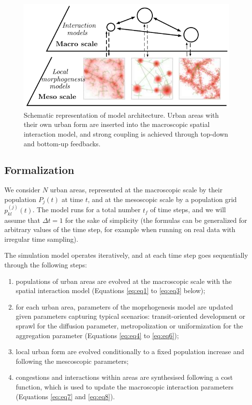 \documentclass[11pt]{article}
\begin{document}
\begin{figure}
 \includegraphics[width=\linewidth]{multiscale_morph.pdf}
 \caption{Schematic representation of model architecture. Urban areas with their own urban form are inserted into the macroscopic spatial interaction model, and strong coupling is achieved through top-down and bottom-up feedbacks.\label{fig:fig1}}
\end{figure}

\subsection{Formalization}


We consider $N$ urban areas, represented at the macroscopic scale by their population $P_j(t)$ at time $t$, and at the mesoscopic scale by a population grid $p_{kl}^{(j)}(t)$. The model runs for a total number $t_f$ of time steps, and we will assume that $\Delta t = 1$ for the sake of simplicity (the formulas can be generalized for arbitrary values of the time step, for example when running on real data with irregular time sampling).

The simulation model operates iteratively, and at each time step goes sequentially through the following steps:
\begin{enumerate}
	\item populations of urban areas are evolved at the macroscopic scale with the spatial interaction model (Equations \ref{eq:eq1} to \ref{eq:eq3} below);
	\item for each urban area, parameters of the moprhogenesis model are updated given parameters capturing typical scenarios: transit-oriented development or sprawl for the diffusion parameter, metropolization or uniformization for the aggregation parameter (Equations \ref{eq:eq4} to \ref{eq:eq6});
	\item local urban form are evolved conditionally to a fixed population increase and following the mescoscopic parameters;
	\item congestions and interactions within areas are synthesised following a cost function, which is used to update the macroscopic interaction parameters (Equations \ref{eq:eq7} and \ref{eq:eq8}).
\end{enumerate}
\end{document}
